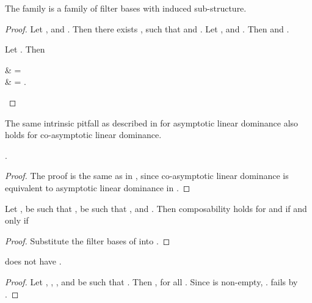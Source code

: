 \documentclass[b5paper, english, oneside]{memoir}
\begin{document}
\begin{theorem}
\label{CoasymptoticLinearDominanceIsLocalLinearDominance}
The family  is a family of filter bases with induced sub-structure.
\end{theorem}

\begin{proof}
Let , and . Then there exists , such that  and . Let , and . Then  and . 

Let . Then
\begin{eqs}
 & =  \\
{} & = . 
\end{eqs}
\end{proof}

\begin{note}
The same intrinsic pitfall as described in  for asymptotic linear dominance also holds for co-asymptotic linear dominance.
\end{note}

\begin{theorem}
\label{CoasymptoticOneSeparation}
.
\end{theorem}

\begin{proof}
The proof is the same as in , since co-asymptotic linear dominance is equivalent to asymptotic linear dominance in .
\end{proof}

\begin{theorem}
\label{CoasymptoticCompositionForFixedS}
Let ,  be such that ,  be such that , and . Then composability holds for  and  if and only if

\end{theorem}

\begin{proof}
Substitute the filter bases of  into .
\end{proof}

\begin{theorem}
\label{CoasymptoticInjectiveSubComposabilityFails}
 does not have .
\end{theorem}

\begin{proof}
Let , , , and  be such that . Then , for all . Since  is non-empty, .  fails by .
\end{proof}
\end{document}
